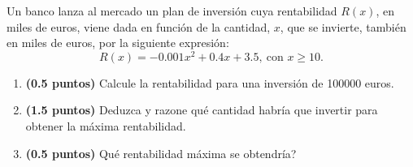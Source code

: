 
Un banco lanza al mercado un plan de inversión cuya rentabilidad $R(x)$, en miles de euros, viene dada en función de la cantidad, $x$, que se invierte, también en miles de euros, por la siguiente expresión:
\[
R(x)=-0.001x^2+0.4x+3.5,\ \text{con }x\geq10.
\]
\begin{enumerate}[label=\alph*)]
\item \textbf{(0.5 puntos)} Calcule la rentabilidad para una inversión de 100000 euros.
\item \textbf{(1.5 puntos)} Deduzca y razone qué cantidad habría que invertir para obtener la máxima rentabilidad.
\item \textbf{(0.5 puntos)} \textquestiondown{}Qué rentabilidad máxima se obtendría?
\end{enumerate}
